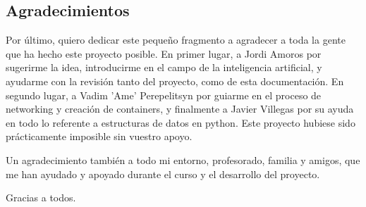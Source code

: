 \documentclass{article}
\begin{document}
\subsection{Agradecimientos}
\label{sec:Thanks}
Por último, quiero dedicar este pequeño fragmento a agradecer a toda la gente que ha hecho este proyecto posible. En primer lugar, a Jordi Amoros por sugerirme la idea, introducirme en el campo de la inteligencia artificial, y ayudarme con la revisión tanto del proyecto, como de esta documentación. En segundo lugar, a Vadim 'Ame' Perepelitsyn por guiarme en el proceso de networking y creación de containers, y finalmente a Javier Villegas por su ayuda en todo lo referente a estructuras de datos en python. Este proyecto hubiese sido prácticamente imposible sin vuestro apoyo.

Un agradecimiento también a todo mi entorno, profesorado, familia y amigos, que me han ayudado y apoyado durante el curso y el desarrollo del proyecto.

Gracias a todos.

\newpage
\end{document}
